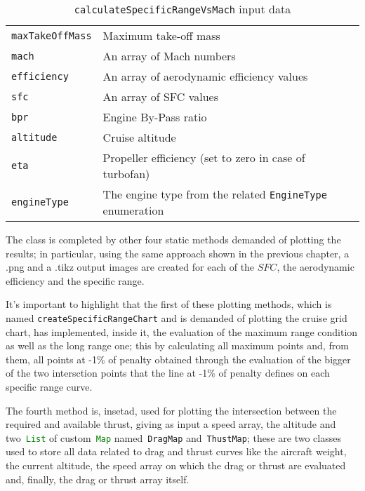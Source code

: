 \begin{table}[!b]
\begin{tabular}{p{7cm}p{7.5cm}}
\toprule
\lstinline[language=Java]!maxTakeOffMass! & Maximum take-off mass \\[0.1	cm]
\lstinline[language=Java]!mach!	& An array of Mach numbers \\[0.1cm]
\lstinline[language=Java]!efficiency!	& An array of aerodynamic efficiency values \\[0.1cm]
\lstinline[language=Java]!sfc!	& An array of SFC values \\[0.1cm]
\lstinline[language=Java]!bpr! & Engine By-Pass ratio \\[0.1cm]
\lstinline[language=Java]!altitude! & Cruise altitude \\[0.1cm]
\lstinline[language=Java]!eta!	& Propeller efficiency (set to zero in case of turbofan) \\[0.1cm]
\lstinline[language=Java]!engineType! & The engine type from the related \lstinline[language=Java]!EngineType! enumeration \\
\bottomrule
\end{tabular}
\caption{ \lstinline[language=Java]!calculateSpecificRangeVsMach! input data}
\label{table:Table3}
\end{table}

\bigskip
\noindent
The class is completed by other four static methods demanded of plotting the results; in particular, using the same approach shown in the previous chapter, a .png and a .tikz output images are created for each of the $SFC$, the aerodynamic efficiency and the specific range.

It's important to highlight that the first of these plotting methods, which is named \lstinline[language=Java]!createSpecificRangeChart! and is demanded of plotting the cruise grid chart, has implemented, inside it, the evaluation of the maximum range condition as well as the long range one; this by calculating all maximum points and, from them, all points at -1\% of penalty obtained through the evaluation of the bigger of the two intersction points that the line at -1\% of penalty defines on each specific range curve.

\noindent
The fourth method is, insetad, used for plotting the intersection between the required and available thrust, giving as input a speed array, the altitude and two~\lstinline[language=Java]!List! of custom~\lstinline[language=Java]!Map! named~\lstinline[language=Java]!DragMap! and~\lstinline[language=Java]!ThustMap!; these are two classes used to store all data related to drag and thrust curves like the aircraft weight, the current altitude, the speed array on which the drag or thrust are evaluated and, finally, the drag or thrust array itself.  

